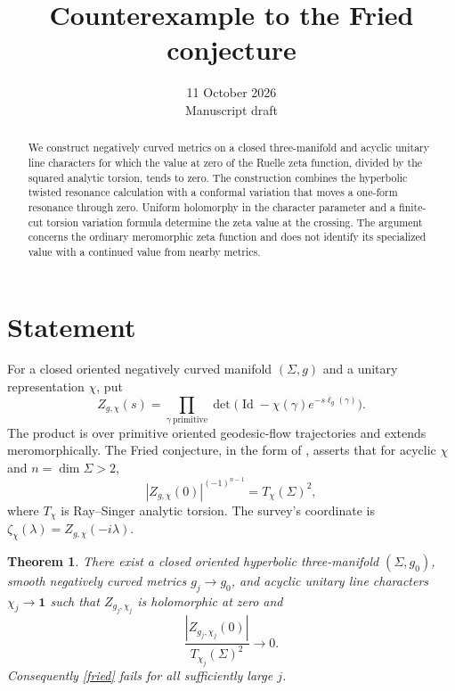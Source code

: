 \documentclass[11pt]{article}
\title{Counterexample to the Fried conjecture}
\author{}
\date{11 October 2026\\[2pt]\small Manuscript draft}
\newtheorem{theorem}{Theorem}
\newcommand{\Id}{\operatorname{Id}}
\begin{document}
\maketitle

\begin{abstract}
We construct negatively curved metrics on a closed three-manifold and
acyclic unitary line characters for which the value at zero of the Ruelle
zeta function, divided by the squared analytic torsion, tends to zero.
The construction combines the hyperbolic twisted resonance calculation
with a conformal variation that moves a one-form resonance through zero.
Uniform holomorphy in the character parameter and a finite-cut torsion
variation formula determine the zeta value at the crossing. The argument
concerns the ordinary meromorphic zeta function and does not identify its
specialized value with a continued value from nearby metrics.
\end{abstract}

\section{Statement}
For a closed oriented negatively curved manifold $(\Sigma,g)$ and a
unitary representation $\chi$, put
\begin{equation}\label{zeta}
 Z_{g,\chi}(s)=\prod_{\gamma\ \mathrm{primitive}}
       \det\bigl(\Id-\chi(\gamma)e^{-s\ell_g(\gamma)}\bigr).
\end{equation}
The product is over primitive oriented geodesic-flow trajectories and
extends meromorphically. The Fried conjecture, in the form of
\cite[Conjecture 9]{Zw}, asserts that for acyclic $\chi$ and
$n=\dim\Sigma>2$,
\begin{equation}\label{fried}
 |Z_{g,\chi}(0)|^{(-1)^{n-1}}=T_\chi(\Sigma)^2,
\end{equation}
where $T_\chi$ is Ray--Singer analytic torsion. The survey's coordinate
is $\zeta_\chi(\lambda)=Z_{g,\chi}(-i\lambda)$.

\begin{theorem}\label{main}
There exist a closed oriented hyperbolic three-manifold $(\Sigma,g_0)$,
smooth negatively curved metrics $g_j\to g_0$, and acyclic unitary line
characters $\chi_j\to\mathbf1$ such that $Z_{g_j,\chi_j}$ is holomorphic
at zero and
\begin{equation}\label{ratio}
 \frac{|Z_{g_j,\chi_j}(0)|}{T_{\chi_j}(\Sigma)^2}\longrightarrow0.
\end{equation}
Consequently \eqref{fried} fails for all sufficiently large $j$.
\end{theorem}
\end{document}
